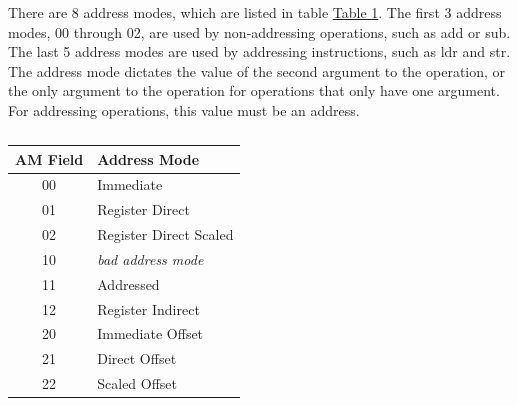 \documentclass[12pt]{article}
\begin{document}
There are 8 address modes, which are listed in table
\hyperref[tab:Address Modes]{Table \ref{tab:Address Modes}}. The first 3 address modes, 00 through 02,
are used by non-addressing operations, such as add or sub. The last 5 address modes are used by
addressing instructions, such as ldr and str. The address mode dictates the value of the
second argument to the operation, or the only argument to the operation for operations that
only have one argument. For addressing operations, this value must be an address.

\begin{table}[h!]
    \centering
    \caption{}
    \label{tab:Address Modes}
    \begin{tabular}{|c|l|}
        \hline
        \textbf{AM} Field & Address Mode \\ \hline
        00 & Immediate \\ \hline
        01 & Register Direct \\ \hline
        02 & Register Direct Scaled \\ \hline
        10 & \textit{bad address mode} \\ \hline
        11 & Addressed \\ \hline
        12 & Register Indirect \\ \hline
        20 & Immediate Offset \\ \hline
        21 & Direct Offset \\ \hline
        22 & Scaled Offset \\ \hline
    \end{tabular}
\end{table}
\end{document}
